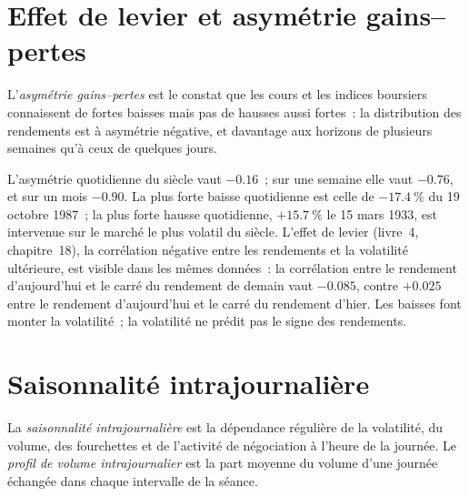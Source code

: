 \section{Effet de levier et asymétrie gains--pertes}

\begin{definition}\label{def:rs:stylised-facts-of-returns:gainloss}
L'\emph{asymétrie gains--pertes} est le constat que les cours et les indices boursiers connaissent de fortes baisses mais
pas de hausses aussi fortes~: la distribution des rendements est à asymétrie négative, et davantage aux horizons de plusieurs semaines qu'à ceux de quelques jours.
\end{definition}

L'asymétrie quotidienne du siècle vaut $-0.16$~; sur une semaine elle vaut $-0.76$, et sur un mois $-0.90$. La plus forte baisse quotidienne est celle de $-17.4~\%$
du 19 octobre 1987~; la plus forte hausse quotidienne, $+15.7~\%$ le 15 mars 1933, est intervenue sur le marché le plus volatil du siècle. L'effet de levier
(livre~4, chapitre~18), la corrélation négative entre les rendements et la volatilité ultérieure, est visible dans les mêmes données~: la
corrélation entre le rendement d'aujourd'hui et le carré du rendement de demain vaut $-0.085$, contre $+0.025$ entre le rendement d'aujourd'hui et
le carré du rendement d'hier. Les baisses font monter la volatilité~; la volatilité ne prédit pas le signe des rendements.

\section{Saisonnalité intrajournalière}

\begin{definition}\label{def:rs:stylised-facts-of-returns:intraday}
La \emph{saisonnalité intrajournalière} est la dépendance régulière de la volatilité, du volume, des fourchettes et
de l'activité de négociation à l'heure de la journée. Le \emph{profil de volume intrajournalier} est la part moyenne du
volume d'une journée échangée dans chaque intervalle de la séance.
\end{definition}

